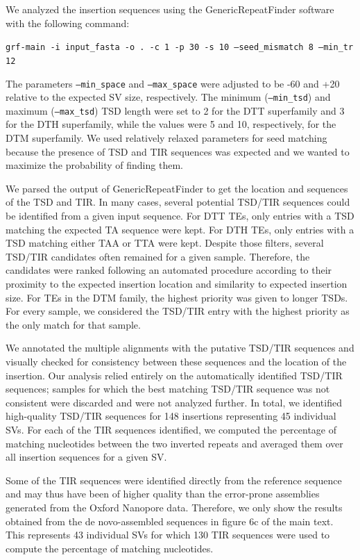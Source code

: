 \documentclass[12pt]{article}
\begin{document}
We analyzed the insertion sequences using the GenericRepeatFinder software \citep{grf} with the following command:

\texttt{grf-main -i input\_fasta -o . -c 1 -p 30 -s 10 --seed\_mismatch 8 --min\_tr 12}

The parameters \texttt{--min\_space} and \texttt{--max\_space} were adjusted to be -60 and +20 relative to the expected SV size, respectively. 
The minimum (\texttt{--min\_tsd}) and maximum (\texttt{--max\_tsd}) TSD length were set to 2 for the DTT superfamily and 3 for the DTH superfamily, while the values were 5 and 10, respectively, for the DTM superfamily. 
We used relatively relaxed parameters for seed matching because the presence of TSD and TIR sequences was expected and we wanted to maximize the probability of finding them.

We parsed the output of GenericRepeatFinder to get the location and sequences of the TSD and TIR.
In many cases, several potential TSD/TIR sequences could be identified from a given input sequence. 
For DTT TEs, only entries with a TSD matching the expected TA sequence were kept. 
For DTH TEs, only entries with a TSD matching either TAA or TTA were kept. 
Despite those filters, several TSD/TIR candidates often remained for a given sample.
Therefore, the candidates were ranked following an automated procedure according to their proximity to the expected insertion location and similarity to expected insertion size.
For TEs in the DTM family, the highest priority was given to longer TSDs.
For every sample, we considered the TSD/TIR entry with the highest priority as the only match for that sample.

We annotated the multiple alignments with the putative TSD/TIR sequences and visually checked for consistency between these sequences and the location of the insertion.
Our analysis relied entirely on the automatically identified TSD/TIR sequences; samples for which the best matching TSD/TIR sequence was not consistent were discarded and were not analyzed further.
In total, we identified high-quality TSD/TIR sequences for 148 insertions representing 45 individual SVs.
For each of the TIR sequences identified, we computed the percentage of matching nucleotides between the two inverted repeats and averaged them over all insertion sequences for a given SV.

Some of the TIR sequences were identified directly from the reference sequence and may thus have been of higher quality than the error-prone assemblies generated from the Oxford Nanopore data.
Therefore, we only show the results obtained from the de novo-assembled sequences in figure 6c of the main text.
This represents 43 individual SVs for which 130 TIR sequences were used to compute the percentage of matching nucleotides.
\end{document}
